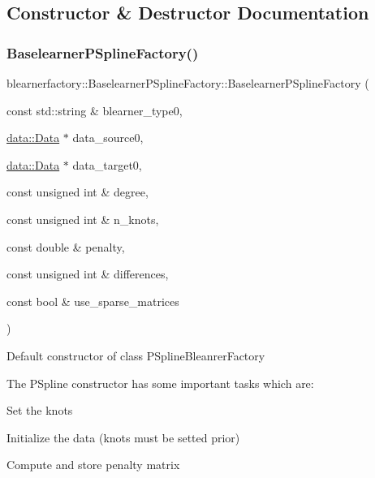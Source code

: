\subsection{Constructor \& Destructor Documentation}
\mbox{\label{classblearnerfactory_1_1_baselearner_p_spline_factory_a295bad8fb9554cb45a56c8b6c5e8e047}} 
\subsubsection{\texorpdfstring{Baselearner\+P\+Spline\+Factory()}{BaselearnerPSplineFactory()}}
{\footnotesize\ttfamily blearnerfactory\+::\+Baselearner\+P\+Spline\+Factory\+::\+Baselearner\+P\+Spline\+Factory (\begin{DoxyParamCaption}\item[{const std\+::string \&}]{blearner\+\_\+type0,  }\item[{\mbox{\hyperlink{classdata_1_1_data}{data\+::\+Data}} $\ast$}]{data\+\_\+source0,  }\item[{\mbox{\hyperlink{classdata_1_1_data}{data\+::\+Data}} $\ast$}]{data\+\_\+target0,  }\item[{const unsigned int \&}]{degree,  }\item[{const unsigned int \&}]{n\+\_\+knots,  }\item[{const double \&}]{penalty,  }\item[{const unsigned int \&}]{differences,  }\item[{const bool \&}]{use\+\_\+sparse\+\_\+matrices }\end{DoxyParamCaption})}



Default constructor of class {\ttfamily P\+Spline\+Bleanrer\+Factory} 

The P\+Spline constructor has some important tasks which are\+:
\begin{DoxyItemize}
\item Set the knots
\item Initialize the data (knots must be setted prior)
\item Compute and store penalty matrix
\end{DoxyItemize}


